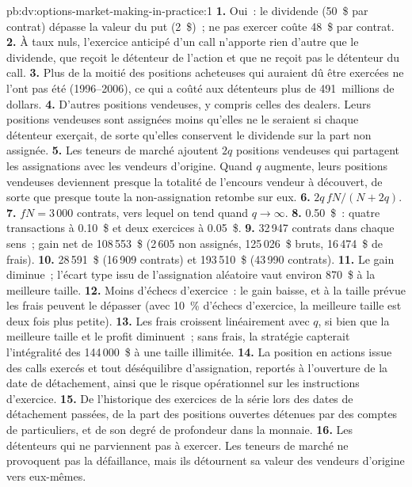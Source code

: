 \begin{solution}{pb:dv:options-market-making-in-practice:1}
\textbf{1.} Oui~: le dividende (50~\$ par contrat) dépasse la valeur du put (2~\$)~; ne pas exercer coûte 48~\$ par contrat.
\textbf{2.} À taux nuls, l'exercice anticipé d'un call n'apporte rien d'autre que le dividende, que reçoit le détenteur de l'action et que ne reçoit pas le détenteur du call.
\textbf{3.} Plus de la moitié des positions acheteuses qui auraient dû être exercées ne l'ont pas été (1996--2006), ce qui a coûté aux détenteurs plus de 491~millions de dollars.
\textbf{4.} D'autres positions vendeuses, y compris celles des dealers. Leurs positions vendeuses sont assignées moins qu'elles ne le seraient si chaque détenteur exerçait, de sorte qu'elles conservent le dividende
sur la part non assignée.
\textbf{5.} Les teneurs de marché ajoutent $2q$ positions vendeuses qui partagent les assignations avec les vendeurs d'origine. Quand $q$ augmente, leurs positions vendeuses deviennent presque la totalité de
l'encours vendeur à découvert, de sorte que presque toute la non-assignation retombe sur eux.
\textbf{6.} $2q\,fN/(N+2q)$.
\textbf{7.} $fN=3\,000$ contrats, vers lequel on tend quand $q\to\infty$.
\textbf{8.} 0.50~\$~: quatre transactions à 0.10~\$ et deux exercices à 0.05~\$.
\textbf{9.} 32\,947 contrats dans chaque sens~; gain net de 108\,553~\$ (2\,605 non assignés, 125\,026~\$ bruts, 16\,474~\$ de frais).
\textbf{10.} 28\,591~\$ (16\,909 contrats) et 193\,510~\$ (43\,990 contrats).
\textbf{11.} Le gain diminue~; l'écart type issu de l'assignation aléatoire vaut environ 870~\$ à la meilleure taille.
\textbf{12.} Moins d'échecs d'exercice~: le gain baisse, et à la taille prévue les frais peuvent le dépasser (avec 10~\% d'échecs d'exercice, la meilleure taille est deux fois plus petite).
\textbf{13.} Les frais croissent linéairement avec $q$, si bien que la meilleure taille et le profit diminuent~; sans frais, la stratégie capterait l'intégralité des 144\,000~\$ à une taille illimitée.
\textbf{14.} La position en actions issue des calls exercés et tout déséquilibre d'assignation, reportés à l'ouverture de la date de détachement, ainsi que le risque opérationnel sur les instructions d'exercice.
\textbf{15.} De l'historique des exercices de la série lors des dates de détachement passées, de la part des positions ouvertes détenues par des comptes de particuliers, et de son degré de profondeur dans la monnaie.
\textbf{16.} Les détenteurs qui ne parviennent pas à exercer. Les teneurs de marché ne provoquent pas la défaillance, mais ils détournent sa valeur des vendeurs d'origine vers eux-mêmes.

\end{solution}
